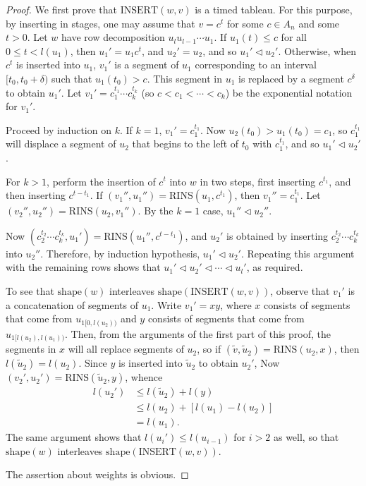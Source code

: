 \documentclass[10pt]{amsproc}
\theoremstyle{definition}
\theoremstyle{remark}
\newcommand{\rowins}{\mathrm{RINS}}
\newcommand{\ins}{\mathrm{INSERT}}
\newcommand{\shape}{\mathrm{shape}}
\begin{document}
\begin{proof}
  We first prove that $\ins(w,v)$ is a timed tableau.
  For this purpose, by inserting in stages, one may assume that $v=c^t$ for some $c\in A_n$ and some $t>0$.
  Let $w$ have row decomposition $u_lu_{l-1}\dotsb u_1$.
  If $u_1(t)\leq c$ for all $0\leq t<l(u_1)$, then $u_1'=u_1c^t$, and $u_2'=u_2$, and so $u_1'\lhd u_2'$.
  Otherwise, when $c^t$ is inserted into $u_1$, $v_1'$ is a segment of $u_1$ corresponding to an interval $[t_0,t_0+\delta)$ such that $u_1(t_0)>c$.
  This segment in $u_1$ is replaced by a segment $c^\delta$ to obtain $u_1'$.
  Let $v_1'=c_1^{t_1}\dotsb c_k^{t_k}$ (so $c<c_1< \dotsb <c_k$) be the exponential notation for $v_1'$.

  Proceed by induction on $k$.
  If $k=1$, $v_1'=c_1^{t_1}$.
  Now $u_2(t_0)>u_1(t_0)=c_1$, so $c_1^{t_1}$ will displace a segment of $u_2$ that begins to the left of $t_0$ with $c_1^{t_1}$, and so $u_1'\lhd u_2'$.

  For $k>1$, perform the insertion of $c^t$ into $w$ in two steps, first inserting $c^{t_1}$, and then inserting $c^{t-t_1}$.
  If $(v_1'',u_1'')=\rowins(u_1,c^{t_1})$, then $v_1''=c_1^{t_1}$.
  Let $(v_2'',u_2'')=\rowins(u_2,v_1'')$.
  By the $k=1$ case, $u_1''\lhd u_2''$.
  
  Now $(c_2^{t_2}\dotsb c_k^{t_k},u_1')=\rowins(u_1'',c^{t-t_1})$, and $u_2'$ is obtained by inserting $c_2^{t_2}\dotsb c_k^{t_k}$ into $u_2''$.
  Therefore, by induction hypothesis, $u_1'\lhd u_2'$.
  Repeating this argument with the remaining rows shows that $u_1'\lhd u_2' \lhd \dotsb \lhd u_l'$, as required.

  To see that $\shape(w)$ interleaves $\shape(\ins(w,v))$, observe that $v_1'$ is a concatenation of segments of $u_1$.
  Write $v_1'=xy$, where $x$ consists of segments that come from $u_{1[0,l(u_2))}$ and $y$ consists of segments that come from $u_{1[l(u_2),l(u_1))}$.
  Then, from the arguments of the first part of this proof, the segments in $x$ will all replace segments of $u_2$, so if $(\tilde v,\tilde u_2)=\rowins(u_2,x)$, then $l(\tilde u_2)=l(u_2)$.
  Since $y$ is inserted into $\tilde u_2$ to obtain $u_2'$,
  Now $(v_2',u_2')=\rowins(\tilde u_2,y)$, whence 
  \begin{align*}
    l(u_2') &\leq l(\tilde u_2)+l(y)\\
    &\leq l(u_2)+[l(u_1)-l(u_2)]\\
    & = l(u_1).
  \end{align*}
  The same argument shows that $l(u_i')\leq l(u_{i-1})$ for $i>2$ as well, so that $\shape(w)$ interleaves $\shape(\ins(w,v))$.

  The assertion about weights is obvious.
\end{proof}
\end{document}
